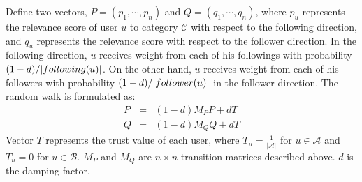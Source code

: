 \documentclass{article}
\begin{document}


Define two vectors, $P = (p_1, \cdots, p_n)$ and $Q = (q_1, \cdots, q_n)$, where $p_u$ represents the relevance score of user $u$ to category $\mathcal{C}$ with respect to the following direction, and $q_u$ represents the relevance score with respect to the follower direction.
In the following direction, $u$ receives weight from each of his followings with probability $(1 - d) / |following(u)|$. On the other hand, $u$ receives weight from each of his followers with probability $(1 - d) / |follower(u)|$ in the follower direction. The random walk is formulated as:
\begin{eqnarray}\label{eq:randomwalk}
P & = & (1 - d) M_P P + d T \nonumber \\
Q & = & (1 - d) M_Q Q + d T
\end{eqnarray}
Vector $T$ represents the trust value of each user, where $T_u = \frac{1}{|\mathcal{A}|}$ for $u \in \mathcal{A}$ and $T_u = 0$ for $u \in \mathcal{B}$. $M_P$ and $M_Q$ are $n \times n$ transition matrices described above. $d$ is the damping factor.
\end{document}
